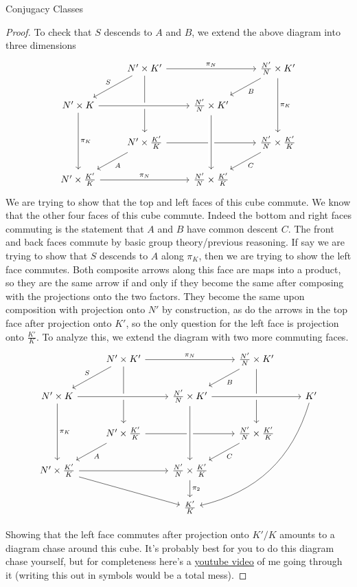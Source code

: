 \documentclass[12nt]{article}
\theoremstyle{plain}
\begin{document}
\begin{subsection}{Conjugacy Classes}
\begin{proof}
To check that $S$ descends to $A$ and $B$, we extend the above diagram into three dimensions
\[
\begin{tikzcd}
 & N' \times K' \ar[dl, "S"'] \ar[rr, "\pi_N"] \ar[dd] & & \frac{N'}{N}  \times K' \ar[dl, "B"] \ar[dd, "\pi_K"] \\
 N' \times K \ar[rr, crossing over] \ar[dd, "\pi_K"] & & \frac{N'}{N} \times K'  \\
 & N' \times \frac{K'}{K} \ar[dl, "A"] \ar[rr] & & \frac{N'}{N} \times \frac{K'}{K} \ar[dl, "C"] \\
 N' \times \frac{K'}{K} \ar[rr, "\pi_N"] & & \frac{N'}{N} \times \frac{K'}{K} \ar[from=2-3, crossing over]
\end{tikzcd} 
\]
We are trying to show that the top and left faces of this cube commute. We know that the other four faces of this cube commute. Indeed the bottom and right faces commuting is the statement that $A$ and $B$ have common descent $C$. The front and back faces commute by basic group theory/previous reasoning. If say we are trying to show that $S$ descends to $A$ along $\pi_K$, then we are trying to show the left face commutes. Both composite arrows along this face are maps into a product, so they are the same arrow if and only if they become the same after composing with the projections onto the two factors. They become the same upon composition with projection onto $N'$ by construction, as do the arrows in the top face after projection onto $K'$, so the only question for the left face is projection onto $\frac{K'}{K}$. To analyze this, we extend the diagram with two more commuting faces.
\[
\begin{tikzcd}
 & N' \times K' \ar[dl, "S"'] \ar[rr, "\pi_N"] \ar[dd] & & \frac{N'}{N}  \times K' \ar[dl, "B"] \ar[dd] \\
 N' \times K \ar[rr, crossing over] \ar[dd, "\pi_K"] & & \frac{N'}{N} \times K' \ar[rr, crossing over] & & K' \ar[dddll, bend left] \\
 & N' \times \frac{K'}{K} \ar[dl, "A"] \ar[rr] & & \frac{N'}{N} \times \frac{K'}{K} \ar[dl, "C"] \\
 N' \times \frac{K'}{K} \ar[rr] \ar[drr] & & \frac{N'}{N} \times \frac{K'}{K} \ar[d, "\pi_2"] \ar[from=2-3, crossing over] \\
  & & \frac{K'}{K}
\end{tikzcd} 
\]

Showing that the left face commutes after projection onto $K'/K$ amounts to a diagram chase around this cube. It's probably best for you to do this diagram chase yourself, but for completeness here's a \textcolor{blue}{\underline{\href{https://youtu.be/pygdsX-8r_o}{youtube video}}} of me going through it (writing this out in symbols would be a total mess).


\end{proof}
\end{subsection}
\end{document}
